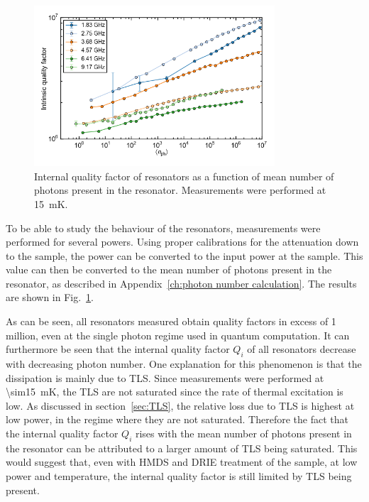 \begin{figure}
    \centering
    \includegraphics[width=0.8\textwidth]{Figures/DRIE/Qi_vs_n_photon.png}
    \caption{Internal quality factor of resonators as a function of mean number of photons present in the resonator. Measurements were performed at \SI{15}{\milli \kelvin}.}
    \label{fig:Qi_vs_n_photon}
\end{figure}
To be able to study the behaviour of the resonators, measurements were performed for several powers. Using proper calibrations for the attenuation down to the sample, the power can be converted to the input power at the sample. This value can then be converted to the mean number of photons present in the resonator, as described in Appendix~\ref{ch:photon number calculation}. The results are shown in Fig.~\ref{fig:Qi_vs_n_photon}.

As can be seen, all resonators measured obtain quality factors in excess of 1 million, even at the single photon regime used in quantum computation. It can furthermore be seen that the internal quality factor $Q_i$ of all resonators decrease with decreasing photon number. One explanation for this phenomenon is that the dissipation is mainly due to TLS. Since measurements were performed at \SI{\sim15}{mK}, the TLS are not saturated since the rate of thermal excitation is low. As discussed in section~\ref{sec:TLS}, the relative loss due to TLS is highest at low power, in the regime where they are not saturated. Therefore the fact that the internal quality factor $Q_i$ rises with the mean number of photons present in the resonator can be attributed to a larger amount of TLS being saturated. This would suggest that, even with HMDS and DRIE treatment of the sample, at low power and temperature, the internal quality factor is still limited by TLS being present.

